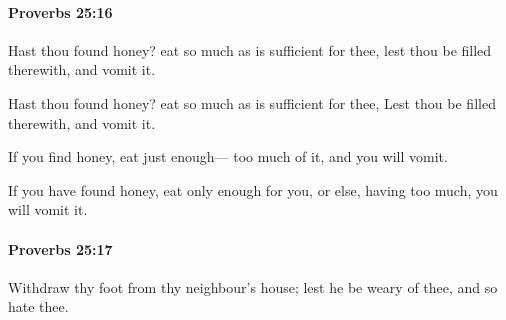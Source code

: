 		\paragraph{Proverbs 25:16} %
			\label{PROVERBS-25-16}

			Hast thou found honey? eat so much as is sufficient for thee, lest thou be filled therewith, and vomit it.

			\begin{versebox}
					\item[BHS] 
					\item[ASV] Hast thou found honey? eat so much as is sufficient for thee, Lest thou be filled therewith, and vomit it.
					\item[NIV] If you find honey, eat just enough— too much of it, and you will vomit.
					\item[NRSV] If you have found honey, eat only enough for you, or else, having too much, you will vomit it.
			\end{versebox}

		\paragraph{Proverbs 25:17} %
			\label{PROVERBS-25-17}

			Withdraw thy foot from thy neighbour’s house; lest he be weary of thee, and so hate thee.

